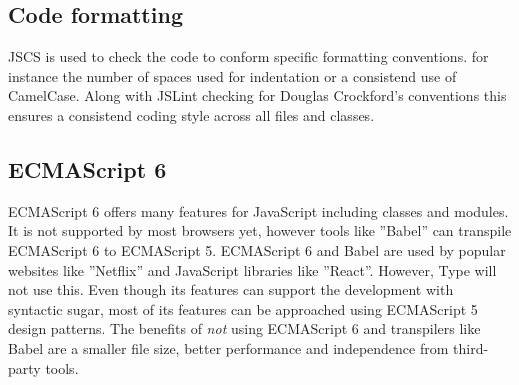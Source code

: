 \subsection{Code formatting}

JSCS is used to check the code to conform specific formatting conventions. for instance the number of spaces used for indentation or a consistend use of CamelCase. Along with JSLint checking for Douglas Crockford's conventions this ensures a consistend coding style across all files and classes.

\subsection{ECMAScript 6} 

ECMAScript 6 offers many features for JavaScript including classes and modules. It is not supported by most browsers yet, however tools like ''Babel'' can transpile ECMAScript 6 to ECMAScript 5. ECMAScript 6 and Babel are used by popular websites like ''Netflix'' and JavaScript libraries like ''React''. However, Type will not use this. Even though its features can support the development with syntactic sugar, most of its features can be approached using ECMAScript 5 design patterns. The benefits of \textit{not} using ECMAScript 6 and transpilers like Babel are a smaller file size, better performance and independence from third-party tools.







